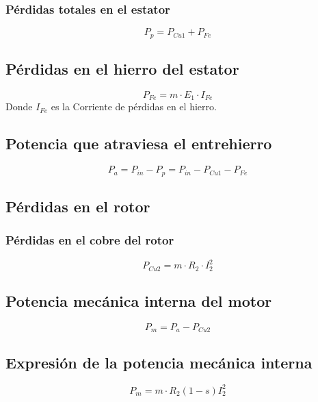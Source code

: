\documentclass[../main]{subfiles}
\begin{document}
\subsubsection{Pérdidas totales en el estator}
\begin{equation}
  P_{p} = P_{Cu1} + P_{Fe}
\end{equation}

\subsection{Pérdidas en el hierro del estator}
\begin{equation}
  P_{Fe} = m \cdot E_1 \cdot I_{Fe}
\end{equation}
Donde $I_{Fe}$ es la Corriente de pérdidas en el hierro.

\subsection{Potencia que atraviesa el entrehierro}
\begin{equation}
  P_a = P_{in} - P_p = P_{in} - P_{Cu1} - P_{Fe}
\end{equation}

\subsection{Pérdidas en el rotor}

\subsubsection{Pérdidas en el cobre del rotor}
\begin{equation}
  P_{Cu2} = m \cdot R_2 \cdot I_2^2
\end{equation}

\subsection{Potencia mecánica interna del motor}
\begin{equation}
  P_m = P_a - P_{Cu2}
\end{equation}

\subsection{Expresión de la potencia mecánica interna}
\begin{equation}
  P_m = m \cdot R_2 (1-s) I_2^2
\end{equation}
\end{document}
